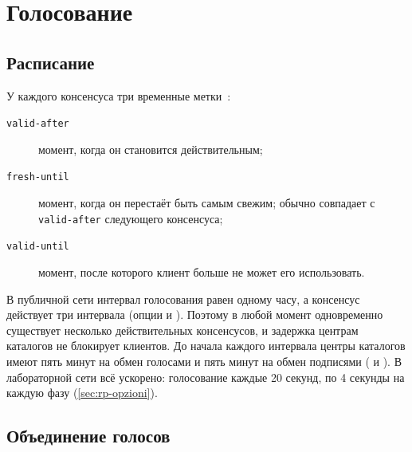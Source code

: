 \section{Голосование}\label{sec:dir-voto}

\subsection{Расписание}

У каждого консенсуса три временные метки~:
\begin{description}
  \item[\texttt{valid-after}] момент, когда он становится действительным;
  \item[\texttt{fresh-until}] момент, когда он перестаёт быть самым свежим; обычно совпадает с \texttt{valid-after} следующего консенсуса;
  \item[\texttt{valid-until}] момент, после которого клиент больше не может его использовать.
\end{description}
В публичной сети интервал голосования равен одному часу, а консенсус действует три интервала (опции  и ). Поэтому в любой момент одновременно существует несколько действительных консенсусов, и задержка центрам каталогов не блокирует клиентов. До начала каждого интервала центры каталогов имеют пять минут на обмен голосами и пять минут на обмен подписями ( и ). В лабораторной сети всё ускорено: голосование каждые 20 секунд, по 4 секунды на каждую фазу (\cref{sec:rp-opzioni}).

\subsection{Объединение голосов}

